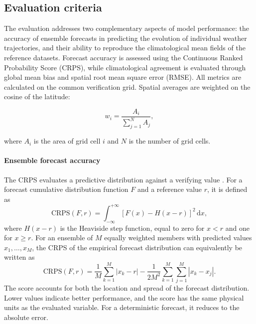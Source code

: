\subsection{Evaluation criteria}
\label{evaluation}

The evaluation addresses two complementary aspects of model performance: the accuracy of ensemble forecasts in predicting the evolution of individual weather trajectories, and their ability to reproduce the climatological mean fields of the reference datasets. Forecast accuracy is assessed using the Continuous Ranked Probability Score (CRPS), while climatological agreement is evaluated through global mean bias and spatial root mean square error (RMSE). All metrics are calculated on the common verification grid. Spatial averages are weighted on the cosine of the latitude:

\begin{equation}
    w_i = \frac{A_i}{\sum_{j=1}^{N} A_j},
\end{equation}

where $A_i$ is the area of grid cell $i$ and $N$ is the number of grid cells.

\paragraph{Ensemble forecast accuracy}

The CRPS evaluates a predictive distribution against a verifying value \citep{gneiting_strictly_2007}. For a forecast cumulative distribution function $F$ and a reference value $r$, it is defined as
\begin{equation}
    \mathrm{CRPS}(F,r)
    =
    \int_{-\infty}^{+\infty}
    \left[F(x)-H(x-r)\right]^2 \,\mathrm{d}x,
    \label{eq:crps}
\end{equation}
where $H(x-r)$ is the Heaviside step function, equal to zero for $x<r$ and one for $x\geq r$. For an ensemble of $M$ equally weighted members with predicted values $x_1,\ldots,x_M$, the CRPS of the empirical forecast distribution can equivalently be written as
\begin{equation}
    \mathrm{CRPS}(F,r)
    =
    \frac{1}{M}\sum_{k=1}^{M}|x_k-r|
    -
    \frac{1}{2M^2}
    \sum_{k=1}^{M}\sum_{j=1}^{M}|x_k-x_j|.
    \label{eq:crps-ensemble}
\end{equation}
The score accounts for both the location and spread of the forecast distribution. Lower values indicate better performance, and the score has the same physical units as the evaluated variable. For a deterministic forecast, it reduces to the absolute error.

